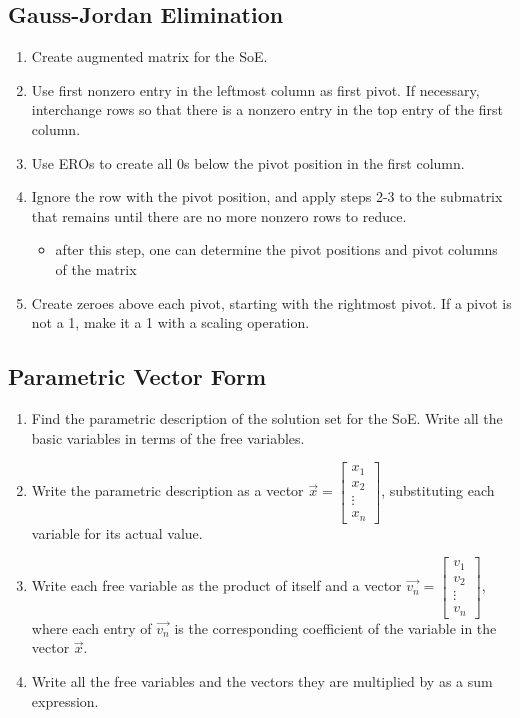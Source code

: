 \documentclass[a4paper,12pt]{article}
\theoremstyle{definition}
\theoremstyle{definition}
\begin{document}
	\subsection{Gauss-Jordan Elimination}
	\label{sec:g-j-elim}
	\begin{enumerate}
		\item Create augmented matrix for the SoE.
		
		\item Use first nonzero entry in the leftmost column as first pivot. If necessary, interchange rows so that there is a nonzero entry in the top entry of the first column.
		
		\item Use EROs to create all 0s below the pivot position in the first column.
		
		\item Ignore the row with the pivot position, and apply steps 2-3 to the submatrix that remains until there are no more nonzero rows to reduce.
		\begin{itemize}
			\item after this step, one can determine the pivot positions and pivot columns of the matrix
		\end{itemize}
		
		\item Create zeroes above each pivot, starting with the rightmost pivot. If a pivot is not a 1, make it a 1 with a scaling operation.
	\end{enumerate}
	
	\subsection{Parametric Vector Form}
	\label{sec:parametric-vector-form}
	\begin{enumerate}
		\item Find the parametric description of the solution set for the SoE. Write all the basic variables in terms of the free variables.
		
		\item Write the parametric description as a vector
		$\vec{x} =
		\begin{bmatrix}
			x_1\\
			x_2\\
			\vdots\\
			x_n
		\end{bmatrix}$,
		substituting each variable for its actual value.
		
		\item Write each free variable as the product of itself and a vector $\vec{v_n} =
		\begin{bmatrix}
			v_1\\
			v_2\\
			\vdots\\
			v_n
		\end{bmatrix}$,
		where each entry of $\vec{v_n}$ is the corresponding coefficient of the variable in the vector $\vec{x}$.
		
		\item Write all the free variables and the vectors they are multiplied by as a sum expression.
	\end{enumerate}
	
\end{document}
